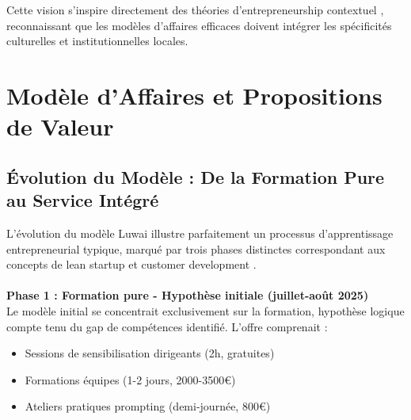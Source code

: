 Cette vision s'inspire directement des théories d'entrepreneurship contextuel \cite{welter2011contextualizing}, reconnaissant que les modèles d'affaires efficaces doivent intégrer les spécificités culturelles et institutionnelles locales.

\section{Modèle d'Affaires et Propositions de Valeur}

\subsection{Évolution du Modèle : De la Formation Pure au Service Intégré}

L'évolution du modèle Luwai illustre parfaitement un processus d'apprentissage entrepreneurial typique, marqué par trois phases distinctes correspondant aux concepts de lean startup et customer development \cite{blank2013startup,ries2011lean}.
\\\\
\textbf{Phase 1 : Formation pure - Hypothèse initiale (juillet-août 2025)}\\
Le modèle initial se concentrait exclusivement sur la formation, hypothèse logique compte tenu du gap de compétences identifié. L'offre comprenait :
\begin{itemize}
    \item Sessions de sensibilisation dirigeants (2h, gratuites)
    \item Formations équipes (1-2 jours, 2000-3500€)
    \item Ateliers pratiques prompting (demi-journée, 800€)
\end{itemize}

